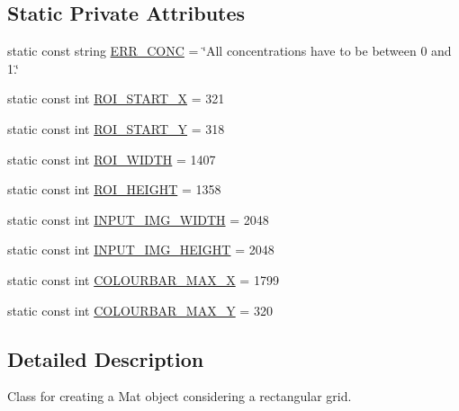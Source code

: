 \subsection*{\-Static \-Private \-Attributes}
\begin{DoxyCompactItemize}
\item 
static const string \hyperlink{classmultiscale_1_1analysis_1_1RectangularMatFactory_a43300d891b115e25dfa33507c74cb8ab}{\-E\-R\-R\-\_\-\-C\-O\-N\-C} = \char`\"{}\-All concentrations have to be between 0 and 1.\char`\"{}
\item 
static const int \hyperlink{classmultiscale_1_1analysis_1_1RectangularMatFactory_a90e622e964218af93ca0d024dc3faa41}{\-R\-O\-I\-\_\-\-S\-T\-A\-R\-T\-\_\-\-X} = 321
\item 
static const int \hyperlink{classmultiscale_1_1analysis_1_1RectangularMatFactory_a1a25934dba59fe883d88e9735eb33db6}{\-R\-O\-I\-\_\-\-S\-T\-A\-R\-T\-\_\-\-Y} = 318
\item 
static const int \hyperlink{classmultiscale_1_1analysis_1_1RectangularMatFactory_aeb6f19ae65802df5f876cd0e15b27a48}{\-R\-O\-I\-\_\-\-W\-I\-D\-T\-H} = 1407
\item 
static const int \hyperlink{classmultiscale_1_1analysis_1_1RectangularMatFactory_a66855a873613668d15773b85efea9829}{\-R\-O\-I\-\_\-\-H\-E\-I\-G\-H\-T} = 1358
\item 
static const int \hyperlink{classmultiscale_1_1analysis_1_1RectangularMatFactory_ae933a387b469afd8f7225641655cebb0}{\-I\-N\-P\-U\-T\-\_\-\-I\-M\-G\-\_\-\-W\-I\-D\-T\-H} = 2048
\item 
static const int \hyperlink{classmultiscale_1_1analysis_1_1RectangularMatFactory_a5049341e062acc91027386befc8814be}{\-I\-N\-P\-U\-T\-\_\-\-I\-M\-G\-\_\-\-H\-E\-I\-G\-H\-T} = 2048
\item 
static const int \hyperlink{classmultiscale_1_1analysis_1_1RectangularMatFactory_a9a91307705bb2d4cc8e837718ce330a8}{\-C\-O\-L\-O\-U\-R\-B\-A\-R\-\_\-\-M\-A\-X\-\_\-\-X} = 1799
\item 
static const int \hyperlink{classmultiscale_1_1analysis_1_1RectangularMatFactory_a5a9cd4ea96ec3c9bddcf610d397d187a}{\-C\-O\-L\-O\-U\-R\-B\-A\-R\-\_\-\-M\-A\-X\-\_\-\-Y} = 320
\end{DoxyCompactItemize}


\subsection{\-Detailed \-Description}
\-Class for creating a \-Mat object considering a rectangular grid. 

